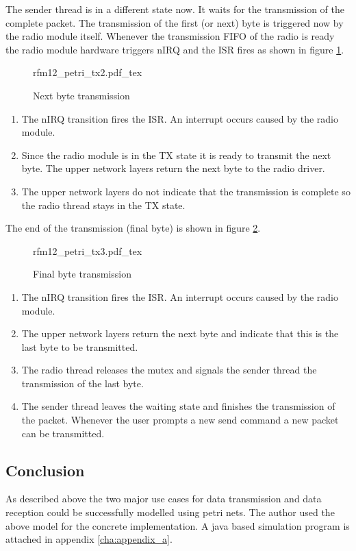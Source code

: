 The sender thread is in a different state now. It waits for the transmission of the complete packet. The transmission of the first (or next) byte is triggered now by the radio module itself. Whenever the transmission FIFO of the radio is ready the radio module hardware triggers nIRQ and the ISR fires as shown in figure \ref{fig:petri-tx2}.

\begin{figure}[H]
\centering
{rfm12_petri_tx2.pdf_tex}
\caption{Next byte transmission}
\label{fig:petri-tx2}
\end{figure}

\begin{enumerate}
    \item The nIRQ transition fires the ISR. An interrupt occurs caused by the radio module.
    \item Since the radio module is in the TX state it is ready to transmit the next byte. The upper network layers return the next byte to the radio driver.
    \item The upper network layers do not indicate that the transmission is complete so the radio thread stays in the TX state.
\end{enumerate}

The end of the transmission (final byte) is shown in figure \ref{fig:petri-tx3}.

\begin{figure}[H]
\centering
{rfm12_petri_tx3.pdf_tex}
\caption{Final byte transmission}
\label{fig:petri-tx3}
\end{figure}

\begin{enumerate}
    \item The nIRQ transition fires the ISR. An interrupt occurs caused by the radio module.
    \item The upper network layers return the next byte and indicate that this is the last byte to be transmitted.
    \item The radio thread releases the mutex and signals the sender thread the transmission of the last byte.
    \item The sender thread leaves the waiting state and finishes the transmission of the packet. Whenever the user prompts a new send command a new packet can be transmitted.
\end{enumerate}

\subsection{Conclusion} %
As described above the two major use cases for data transmission and data reception could be successfully modelled using petri nets. The author used the above model for the concrete implementation. A java based simulation program is attached in appendix \ref{cha:appendix_a}.

